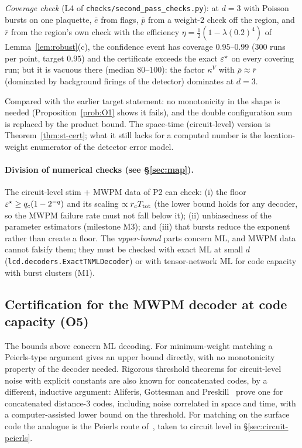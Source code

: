\noindent \emph{Coverage check} (L4 of \texttt{checks/second\_pass\_checks.py}): at $d=3$ with Poisson bursts on one plaquette, $\bar e$ from flags, $\bar p$ from a weight-$2$ check off the region, and $\bar r$ from the region's own check with the efficiency $\eta=\tfrac12(1-\lambda(0.2)^4)$ of Lemma~\ref{lem:robust}(c), the confidence event has coverage $0.95$--$0.99$ ($300$ runs per point, target $0.95$) and the certificate exceeds the exact $\varepsilon^{\star}$ on every covering run; but it is vacuous there (median $80$--$100$): the factor $\kappa^V$ with $\bar\rho\approx\bar r$ (dominated by background firings of the detector) dominates at $d=3$.

\noindent Compared with the earlier target statement: no monotonicity in the shape is needed (Proposition~\ref{prob:O1} shows it fails), and the double configuration sum is replaced by the product bound. The space-time (circuit-level) version is Theorem~\ref{thm:st-cert}; what it still lacks for a computed number is the location-weight enumerator of the detector error model.

\paragraph{Division of numerical checks (see \S\ref{sec:map}).}
The circuit-level stim + MWPM data of P2 can check: (i) the floor $\varepsilon^{\star}\ge q_c(1-2^{-q})$ and its scaling $\propto r_cT_{\rm tot}$
(the lower bound holds for any decoder, so the MWPM failure rate must not fall below it); (ii) unbiasedness of the parameter estimators (milestone M3); and
(iii) that bursts reduce the exponent rather than create a floor. The \emph{upper-bound} parts concern ML, and MWPM data cannot falsify them;
they must be checked with exact ML at small $d$ (\texttt{lcd.decoders.ExactTNMLDecoder}) or with tensor-network ML for code capacity with burst clusters (M1).

\subsection{Certification for the MWPM decoder at code capacity (O5)}\label{sec:mwpm-cert}

The bounds above concern ML decoding. For minimum-weight matching a Peierls-type argument \cite{DKLP} gives an upper bound directly, with no monotonicity property of the decoder needed. Rigorous threshold theorems for circuit-level noise with explicit constants are also known for concatenated codes, by a different, inductive argument: Aliferis, Gottesman and Preskill~\cite{AGP} prove one for concatenated distance-3 codes, including noise correlated in space and time, with a computer-assisted lower bound on the threshold. For matching on the surface code the analogue is the Peierls route of~\cite{DKLP,Fowler}, taken to circuit level in \S\ref{sec:circuit-peierls}.

